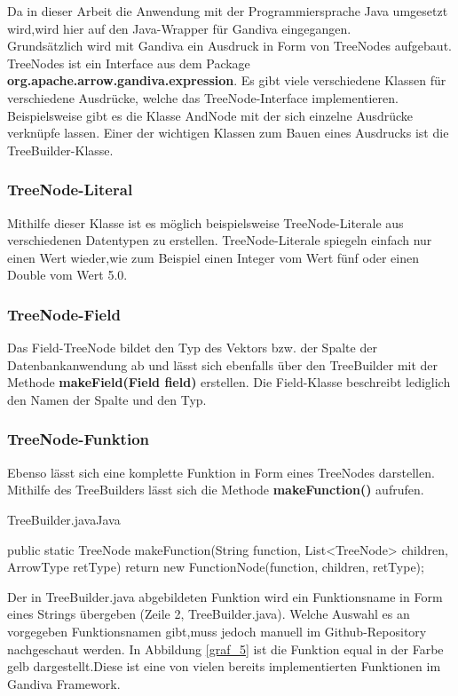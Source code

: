 Da in dieser Arbeit die Anwendung mit der Programmiersprache Java umgesetzt wird,wird hier auf den Java-Wrapper für Gandiva eingegangen.\\
Grundsätzlich wird mit Gandiva ein Ausdruck in Form von TreeNodes aufgebaut. TreeNodes ist ein Interface aus dem Package \textbf{org.apache.arrow.gandiva.expression}. Es gibt viele verschiedene Klassen für verschiedene Ausdrücke, welche das TreeNode-Interface implementieren. 
Beispielsweise gibt es die Klasse AndNode mit der sich einzelne Ausdrücke verknüpfe lassen.
Einer der wichtigen Klassen zum Bauen eines Ausdrucks ist die TreeBuilder-Klasse.

\subsubsection{TreeNode-Literal}
Mithilfe dieser Klasse ist es möglich beispielsweise TreeNode-Literale aus verschiedenen Datentypen zu erstellen. TreeNode-Literale spiegeln einfach nur einen Wert wieder,wie zum Beispiel einen Integer vom Wert fünf oder einen Double vom Wert 5.0. \\

\subsubsection{TreeNode-Field}
Das Field-TreeNode bildet den Typ des Vektors bzw. der Spalte der Datenbankanwendung ab und lässt sich ebenfalls über den TreeBuilder mit der Methode \textbf{makeField(Field field)} erstellen.
Die Field-Klasse beschreibt lediglich den Namen der Spalte und den Typ.

\subsubsection{TreeNode-Funktion}
\label{TreeNode-Funktion}
Ebenso lässt sich eine komplette Funktion in Form eines TreeNodes darstellen.
Mithilfe des TreeBuilders lässt sich die Methode \textbf{makeFunction()} aufrufen.

\begin{codeblock}{TreeBuilder.java}{Java}
  \begin{javacode}
    public static TreeNode makeFunction(String function, List<TreeNode> children, ArrowType retType) {
        return new FunctionNode(function, children, retType);
    }
  \end{javacode}
\end{codeblock}

Der in TreeBuilder.java abgebildeten Funktion wird ein Funktionsname in Form eines Strings übergeben (Zeile 2, TreeBuilder.java). Welche Auswahl es an vorgegeben Funktionsnamen gibt,muss jedoch manuell im Github-Repository nachgeschaut werden. In Abbildung \ref{graf_5} ist die Funktion \glqq{}equal\grqq{} in der Farbe gelb dargestellt.Diese ist eine von vielen bereits implementierten Funktionen im Gandiva Framework.\\

